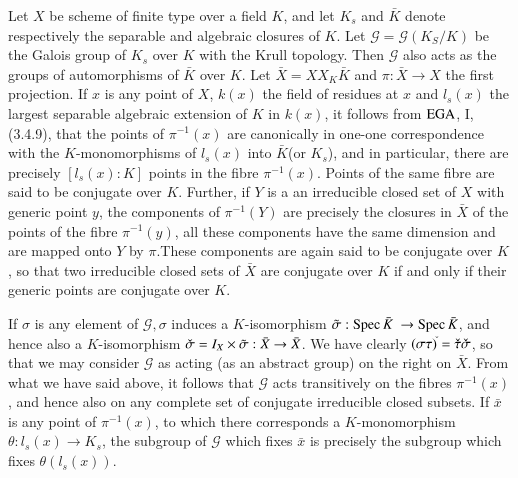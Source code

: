 Let $X$ be scheme of finite type over a field $K$, and let $K_s$ and
$\bar{K}$ denote respectively the separable and algebraic closures of
$K$. Let $\mathscr{G}=\mathscr{G}(K_S/K)$ be the Galois group of $K_s$
over $K$ with the Krull topology. Then $\mathscr{G}$ also acts as the
groups of automorphisms of $\bar{K}$ over $K$. Let $\bar{X} = X X_K
\bar{K}$ and $\pi : \bar{X} \to X$ the first projection. If $x$ is any
point of $X$, $k(x)$ the field of residues at $x$ and $l_s(x)$ the
largest separable algebraic extension of $K$ in $k(x)$, it follows
from $\operatorname{EGA}$, I,(3.4.9), that the points of $\pi^{-1}(x)$ are
canonically in one-one correspondence with the $K$-monomorphisms of
$l_s(x)$ into $\bar{K}$(or $K_s$), and in particular, there are
precisely $[l_s(x) :K]$ points in the fibre $\pi^{-1}(x)$. Points of
the same fibre are said to be conjugate over $K$. Further, if $Y$  is a
an irreducible closed set of $X$  with generic point $y$, the
components of $\pi^{-1}(Y)$ are precisely the closures in $\bar{X}$ of
the points of the fibre $\pi^{-1}(y)$, all these components have the
same dimension and are mapped onto $Y$ by $\pi$.\pageoriginale These
components are 
again said to be conjugate over $K$, so that two irreducible closed
sets of $\bar{X}$ are conjugate over $K$ if and only if their generic
points are conjugate over $K$. 

If $\sigma$ is any element of $\mathscr{G}, \sigma $ induces a
$K$-isomorphism $\tilde{\sigma}: \operatorname{Spec} \bar{K}~\to \operatorname{Spec} \bar{K}$,
and hence also a $K$-isomorphism $\check{\sigma} = I_X \times
\tilde{\sigma} : \bar{X} \to \bar{X}$. We have clearly $(\sigma
\tau)^{\check{}} = \check{\tau} \check{\sigma}$, so that we may consider
$\mathscr{G}$ as acting (as an abstract group) on the right on
$\bar{X}$. From what we have said above, it follows that $\mathscr{G}$
acts transitively on the fibres $\pi^{-1}(x)$, and hence also on any
complete set of conjugate irreducible closed subsets. If $\bar{x}$ is
any point of $\pi^{-1}(x)$, to which there corresponds a
$K$-monomorphism $\theta : l_s(x) \to K_s$, the subgroup of
$\mathscr{G}$ which fixes $\bar{x}$ is precisely the subgroup which
fixes $\theta (l_s(x))$. 


